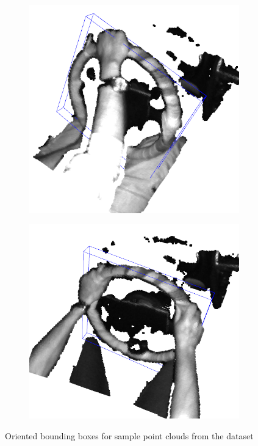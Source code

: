 \begin{figure}[ht]
\begin{subfigure}[t]{0.3\textwidth}
    \end{subfigure}\hfill
    \begin{subfigure}[t]{0.3\textwidth}
        \centering
        \includegraphics[width=\textwidth]{media/chapter 3/obb5.png}
    \end{subfigure}\hfill
    \begin{subfigure}[t]{0.3\textwidth}
        \centering
        \includegraphics[width=\textwidth]{media/chapter 3/obb6.png}
    \end{subfigure}
    \caption{Oriented bounding boxes for sample point clouds from the dataset}
    \label{fig:sample_obbs}
\end{figure}


